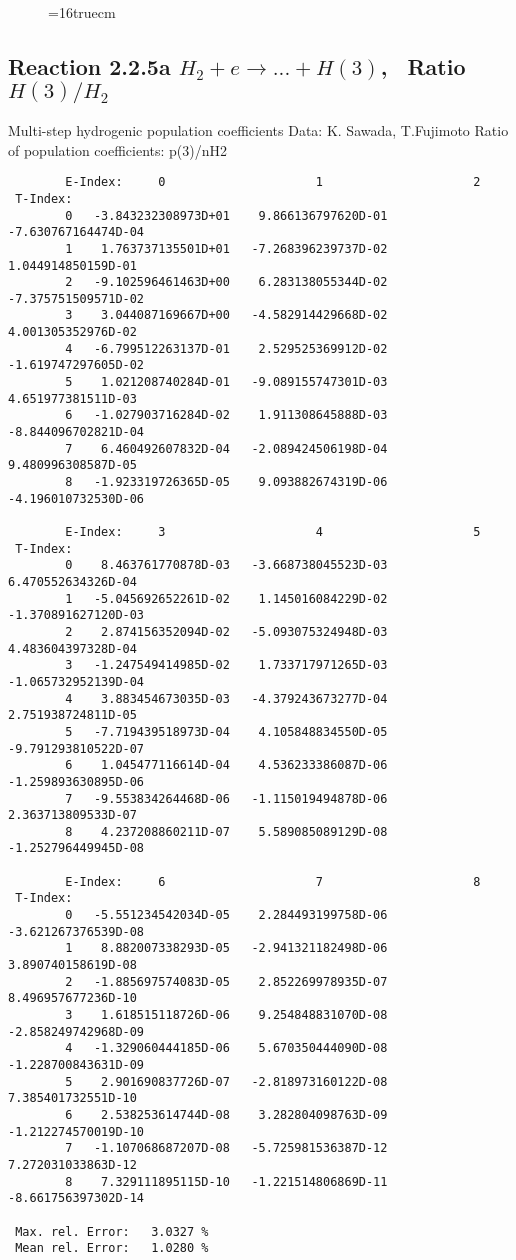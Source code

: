 \documentclass[12pt,dvipdfmx]{article}
\begin{document}
\begin{figure} \label{2.3.6lr1}
\epsfxsize=16truecm
\end{figure}
\newpage

\subsection{
Reaction 2.2.5a $ H_2 + e \rightarrow ...+ H(3) $, \    Ratio $H(3)/H_2 $
}
 Multi-step hydrogenic population coefficients
 Data: K. Sawada, T.Fujimoto \cite{kn:Sawada}
 Ratio of population coefficients: p(3)/nH2


\begin{small}\begin{verbatim}
        E-Index:     0                     1                     2
 T-Index:
        0   -3.843232308973D+01    9.866136797620D-01   -7.630767164474D-04
        1    1.763737135501D+01   -7.268396239737D-02    1.044914850159D-01
        2   -9.102596461463D+00    6.283138055344D-02   -7.375751509571D-02
        3    3.044087169667D+00   -4.582914429668D-02    4.001305352976D-02
        4   -6.799512263137D-01    2.529525369912D-02   -1.619747297605D-02
        5    1.021208740284D-01   -9.089155747301D-03    4.651977381511D-03
        6   -1.027903716284D-02    1.911308645888D-03   -8.844096702821D-04
        7    6.460492607832D-04   -2.089424506198D-04    9.480996308587D-05
        8   -1.923319726365D-05    9.093882674319D-06   -4.196010732530D-06

        E-Index:     3                     4                     5
 T-Index:
        0    8.463761770878D-03   -3.668738045523D-03    6.470552634326D-04
        1   -5.045692652261D-02    1.145016084229D-02   -1.370891627120D-03
        2    2.874156352094D-02   -5.093075324948D-03    4.483604397328D-04
        3   -1.247549414985D-02    1.733717971265D-03   -1.065732952139D-04
        4    3.883454673035D-03   -4.379243673277D-04    2.751938724811D-05
        5   -7.719439518973D-04    4.105848834550D-05   -9.791293810522D-07
        6    1.045477116614D-04    4.536233386087D-06   -1.259893630895D-06
        7   -9.553834264468D-06   -1.115019494878D-06    2.363713809533D-07
        8    4.237208860211D-07    5.589085089129D-08   -1.252796449945D-08

        E-Index:     6                     7                     8
 T-Index:
        0   -5.551234542034D-05    2.284493199758D-06   -3.621267376539D-08
        1    8.882007338293D-05   -2.941321182498D-06    3.890740158619D-08
        2   -1.885697574083D-05    2.852269978935D-07    8.496957677236D-10
        3    1.618515118726D-06    9.254848831070D-08   -2.858249742968D-09
        4   -1.329060444185D-06    5.670350444090D-08   -1.228700843631D-09
        5    2.901690837726D-07   -2.818973160122D-08    7.385401732551D-10
        6    2.538253614744D-08    3.282804098763D-09   -1.212274570019D-10
        7   -1.107068687207D-08   -5.725981536387D-12    7.272031033863D-12
        8    7.329111895115D-10   -1.221514806869D-11   -8.661756397302D-14

 Max. rel. Error:   3.0327 %
 Mean rel. Error:   1.0280 %

\end{verbatim}\end{small}
\end{document}
